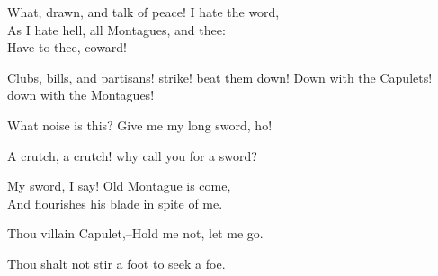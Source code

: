 \begin{speech}
What, drawn, and talk of peace!   I hate the word,
\\
As I hate hell, all Montagues, and thee: \\
Have to thee, coward!   \\
\end{speech}
\begin{speech}
Clubs, bills, and partisans!
 strike! beat them down!
Down with the Capulets! down with the Montagues! 
\end{speech}
\begin{speech}
What noise is this?   Give me my long sword, ho! \\

\end{speech}
\begin{speech}
A crutch, a crutch! why call you for a sword?
\\
\end{speech}
\begin{speech}
My sword, I say!   Old Montague is come, \\
And flourishes his blade in spite of me. 
\\
\end{speech}
\begin{speech}
Thou villain Capulet,--Hold me not, let me go. \\

\end{speech}
\begin{speech}
Thou shalt not stir a foot to seek a foe.  \\
\end{speech}

